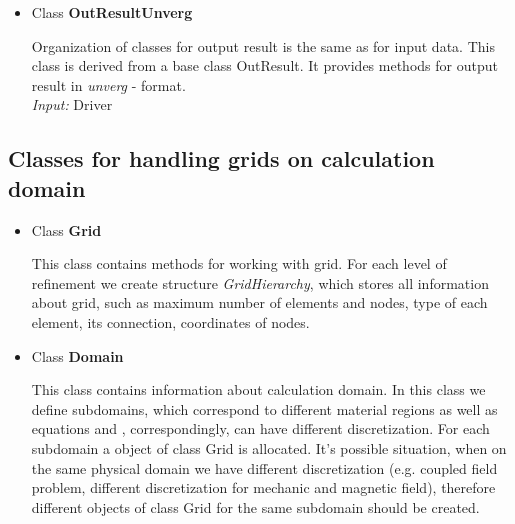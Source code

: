 \begin{itemize}
\begin{print}
{\em Input: } FileType \\
\end{print}
%
\item{ Class {\bf OutResultUnverg}} \\
\begin{print}
Organization of classes for output result is the same as for input data. This class is derived from a base class OutResult.
It provides methods for output result in {\it unverg }- format. \\ 
{\it Input: } Driver \\
\end{print}
\end{itemize}
%
\subsection{ Classes for handling grids on calculation domain} 
%
\begin{itemize}
%
\item{ Class {\bf Grid}} \\
\begin{print}
This class contains methods for working with grid. For each level of refinement we create structure {\it GridHierarchy}, which stores all information about grid, such as maximum number of elements and nodes, type of each element, its connection, coordinates of nodes.    
\end{print}
%
\item{ Class {\bf Domain}} \\
\begin{print}
This class contains information about calculation domain. In this class we define subdomains, which correspond to different material regions as well as equations and , correspondingly, can have different discretization. For each subdomain a object of class Grid is allocated. It's possible situation, when on the same physical domain we have different discretization (e.g. coupled field problem, different discretization for mechanic and magnetic field), therefore different objects of class Grid for the same subdomain should be created.
\end{print}
\end{itemize}
